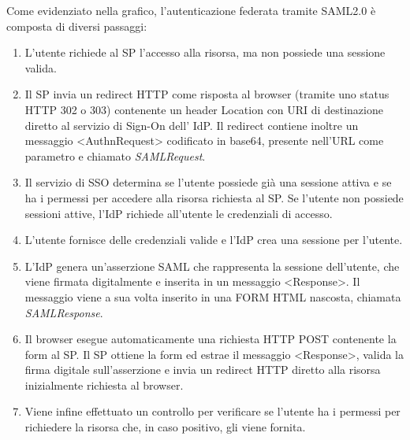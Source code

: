 \documentclass[a4paper]{article}
\begin{document}
Come evidenziato nella grafico, l'autenticazione federata tramite SAML2.0 è composta di diversi passaggi:
\begin{enumerate}
    \item L'utente richiede al SP l'accesso alla risorsa, ma non possiede una sessione valida.
    
    \item Il SP invia un redirect HTTP come risposta al browser (tramite uno status HTTP 302 o 303) contenente un header Location con URI di destinazione diretto al servizio di Sign-On dell' IdP. Il redirect contiene inoltre un messaggio <AuthnRequest> codificato in base64, presente nell'URL come parametro e chiamato \textit{SAMLRequest}.
    
    \item Il servizio di SSO determina se l'utente possiede già una sessione attiva e se ha i permessi per accedere alla risorsa richiesta al SP. Se l'utente non possiede sessioni attive, l'IdP richiede all'utente le credenziali di accesso.
    
    \item L'utente fornisce delle credenziali valide e l'IdP crea una sessione per l'utente.
    
    \item L'IdP genera un'asserzione SAML che rappresenta la sessione dell'utente, che viene firmata digitalmente e inserita in un messaggio <Response>. Il messaggio viene a sua volta inserito in una FORM HTML nascosta, chiamata \textit{SAMLResponse}. 
    
    \item Il browser esegue automaticamente una richiesta HTTP POST contenente la form al SP. Il SP ottiene la form ed estrae il messaggio <Response>, valida la firma digitale sull'asserzione e invia un redirect HTTP diretto alla risorsa inizialmente richiesta al browser.
    
    \item Viene infine effettuato un controllo per verificare se l'utente ha i permessi per richiedere la risorsa che, in caso positivo, gli viene fornita.\cite{saml}
\end{enumerate}
\end{document}
